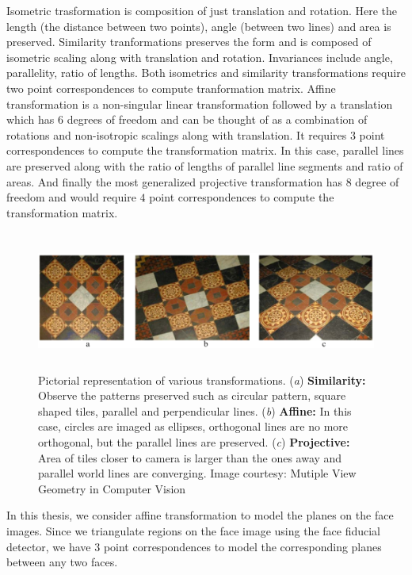 Isometric trasformation is composition of just translation and rotation. Here the length 
(the distance between two points), angle (between two lines) and area is preserved. Similarity tranformations
preserves the form and is composed of isometric scaling along with translation and rotation. Invariances
include angle, parallelity, ratio of lengths. Both isometrics and similarity transformations require two
point correspondences to compute tranformation matrix. Affine transformation is a non-singular linear
transformation followed by a translation which has $6$ degrees of freedom and can be thought of as a 
combination of rotations and non-isotropic scalings along with translation. It requires $3$ point 
correspondences to compute the transformation matrix. In this case, parallel lines are preserved along with the
ratio of lengths of parallel line segments and ratio of areas. And finally the most generalized projective
transformation has $8$ degree of freedom and would require $4$ point correspondences to compute the 
transformation matrix. 

\begin{figure}
    \centering
    \includegraphics[width=6in, height=1.8in]{concepts/figures/affine_transformation.png}
    \caption{Pictorial representation of various transformations. (\textit{a}) \textbf{Similarity:} Observe the patterns preserved such as circular pattern, square shaped tiles, parallel and perpendicular lines.
    (\textit{b}) \textbf{Affine:} In this case, circles are imaged as ellipses, orthogonal lines are no more orthogonal, but the parallel lines are
    preserved. (\textit{c}) \textbf{Projective:} Area of tiles closer to camera is larger than the ones away and parallel world lines are converging. Image courtesy: Mutiple View Geometry in Computer Vision\cite{Hartley2004}}
    \label{fig:affine_transformation}
\end{figure}

In this thesis, we consider affine transformation to model the planes on the face images. Since we triangulate
regions on the face image using the face fiducial detector, we have $3$ point correspondences to model the
corresponding planes between any two faces.
